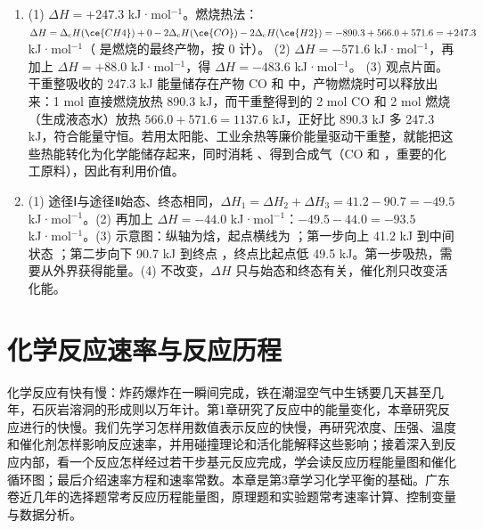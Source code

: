 \documentclass[UTF8,a4paper,zihao=5,oneside,openany,fontset=none]{ctexbook}
\newenvironment{jiexilist}{\small\begin{enumerate}[label={\textbf{\arabic*}.},leftmargin=1.6em,itemsep=0.3em,topsep=0.2em]}{\end{enumerate}}
\begin{document}
\begin{jiexilist}
\item (1) $\Delta H=+247.3$ kJ·mol$^{-1}$。燃烧热法：$\Delta H=\Delta_\text{c}H(\ce{CH4})+0-2\Delta_\text{c}H(\ce{CO})-2\Delta_\text{c}H(\ce{H2})=-890.3+566.0+571.6=+247.3$ kJ·mol$^{-1}$（ 是燃烧的最终产物，按 0 计）。
(2)  $\Delta H=-571.6$ kJ·mol$^{-1}$，再加上  $\Delta H=+88.0$ kJ·mol$^{-1}$，得 $\Delta H=-483.6$ kJ·mol$^{-1}$。
(3) 观点片面。干重整吸收的 247.3 kJ 能量储存在产物 CO 和  中，产物燃烧时可以释放出来：1 mol  直接燃烧放热 890.3 kJ，而干重整得到的 2 mol CO 和 2 mol  燃烧（生成液态水）放热 $566.0+571.6=1137.6$ kJ，正好比 890.3 kJ 多 247.3 kJ，符合能量守恒。若用太阳能、工业余热等廉价能量驱动干重整，就能把这些热能转化为化学能储存起来，同时消耗 、得到合成气（CO 和 ，重要的化工原料），因此有利用价值。
\item (1) 途径Ⅰ与途径Ⅱ始态、终态相同，$\Delta H_1=\Delta H_2+\Delta H_3=41.2-90.7=-49.5$ kJ·mol$^{-1}$。(2) 再加上  $\Delta H=-44.0$ kJ·mol$^{-1}$：$-49.5-44.0=-93.5$ kJ·mol$^{-1}$。(3) 示意图：纵轴为焓，起点横线为 ；第一步向上 41.2 kJ 到中间状态 ；第二步向下 90.7 kJ 到终点 ，终点比起点低 49.5 kJ。第一步吸热，需要从外界获得能量。(4) 不改变，$\Delta H$ 只与始态和终态有关，催化剂只改变活化能。
\end{jiexilist}
\chapter{化学反应速率与反应历程}

化学反应有快有慢：炸药爆炸在一瞬间完成，铁在潮湿空气中生锈要几天甚至几年，石灰岩溶洞的形成则以万年计。第1章研究了反应中的能量变化，本章研究反应进行的快慢。我们先学习怎样用数值表示反应的快慢，再研究浓度、压强、温度和催化剂怎样影响反应速率，并用碰撞理论和活化能解释这些影响；接着深入到反应内部，看一个反应怎样经过若干步基元反应完成，学会读反应历程能量图和催化循环图；最后介绍速率方程和速率常数。本章是第3章学习化学平衡的基础。广东卷近几年的选择题常考反应历程能量图，原理题和实验题常考速率计算、控制变量与数据分析。
\end{document}
